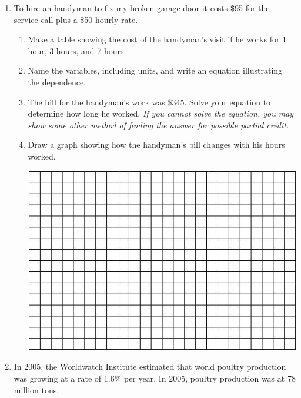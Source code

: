 \documentclass[12pt]{article}
\begin{document}
\begin{enumerate}

\item  To hire an handyman to fix my broken garage door it costs \$95 for the service call plus a \$50 hourly rate.

\begin{enumerate}
\item Make a table showing the cost of the handyman's visit if he works for 1 hour, 3 hours, and 7 hours. 
\vfill
\item Name the variables, including units, and write an equation illustrating the dependence.
\vfill
\item The bill for the handyman's work was \$345.  Solve your equation to determine how long he worked.  \emph{If you cannot solve the equation, you may show some other method of finding the answer for possible partial credit.}
\vfill
\item Draw a graph showing how the handyman's bill changes with his hours worked.
\vspace{.1in}
\begin{center}
 {\includegraphics [width = 6in] {../GraphPaper}}
\end{center}
\vspace{.1in}
\end{enumerate}
\newpage


\item In 2005, the Worldwatch Institute estimated that world poultry production was growing at a rate of 1.6\% per year.  In 2005, poultry production was at 78 million tons.  


\end{enumerate}
\end{document}
